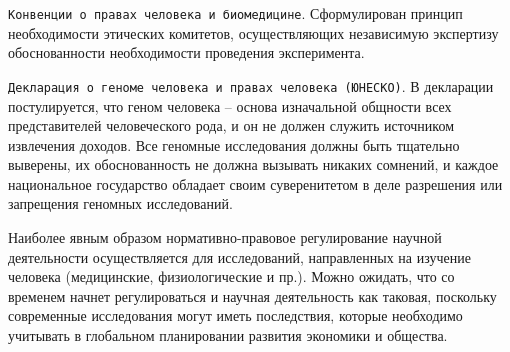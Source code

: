 \texttt{Конвенции о правах человека и биомедицине}. Сформулирован принцип необходимости этических комитетов, осуществляющих независимую экспертизу обоснованности необходимости проведения эксперимента.

\texttt{Декларация о геноме человека и правах человека (ЮНЕСКО)}. В декларации постулируется, что геном человека – основа изначальной общности всех представителей человеческого рода, и он не должен служить источником извлечения доходов. Все геномные исследования должны быть тщательно выверены, их обоснованность не должна вызывать никаких сомнений, и каждое национальное государство обладает своим суверенитетом в деле разрешения или запрещения геномных исследований. 

Наиболее явным образом нормативно-правовое регулирование научной деятельности осуществляется для исследований, направленных на изучение человека (медицинские, физиологические и пр.). Можно ожидать, что со временем начнет регулироваться и научная деятельность как таковая, поскольку современные исследования могут иметь последствия, которые необходимо учитывать в глобальном планировании развития экономики и общества.
